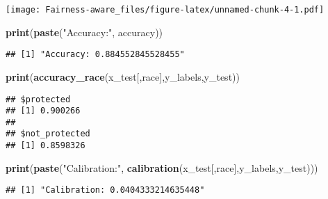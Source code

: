\documentclass[
]{article}
\newenvironment{Shaded}{\begin{snugshade}}{\end{snugshade}}
\newcommand{\AttributeTok}[1]{\textcolor[rgb]{0.13,0.29,0.53}{#1}}
\newcommand{\FunctionTok}[1]{\textcolor[rgb]{0.13,0.29,0.53}{\textbf{#1}}}
\newcommand{\NormalTok}[1]{#1}
\newcommand{\OtherTok}[1]{\textcolor[rgb]{0.56,0.35,0.01}{#1}}
\newcommand{\SpecialCharTok}[1]{\textcolor[rgb]{0.81,0.36,0.00}{\textbf{#1}}}
\newcommand{\StringTok}[1]{\textcolor[rgb]{0.31,0.60,0.02}{#1}}
\begin{document}
\texttt{[image: Fairness-aware\_files/figure-latex/unnamed-chunk-4-1.pdf]}

\begin{Shaded}
\begin{Highlighting}[]
\FunctionTok{print}\NormalTok{(}\FunctionTok{paste}\NormalTok{(}\StringTok{"Accuracy:"}\NormalTok{, accuracy))}
\end{Highlighting}
\end{Shaded}

\begin{verbatim}
## [1] "Accuracy: 0.884552845528455"
\end{verbatim}

\begin{Shaded}
\begin{Highlighting}[]
\FunctionTok{print}\NormalTok{(}\FunctionTok{accuracy\_race}\NormalTok{(x\_test[,}\StringTok{\textquotesingle{}race\textquotesingle{}}\NormalTok{],y\_labels,y\_test))}
\end{Highlighting}
\end{Shaded}

\begin{verbatim}
## $protected
## [1] 0.900266
## 
## $not_protected
## [1] 0.8598326
\end{verbatim}

\begin{Shaded}
\begin{Highlighting}[]
\FunctionTok{print}\NormalTok{(}\FunctionTok{paste}\NormalTok{(}\StringTok{"Calibration:"}\NormalTok{, }\FunctionTok{calibration}\NormalTok{(x\_test[,}\StringTok{\textquotesingle{}race\textquotesingle{}}\NormalTok{],y\_labels,y\_test)))}
\end{Highlighting}
\end{Shaded}

\begin{verbatim}
## [1] "Calibration: 0.0404333214635448"
\end{verbatim}

\begin{Shaded}
\end{Shaded}
\end{document}
